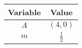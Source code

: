 \begin{tabular}{|c|c|}
\hline
\textbf{Variable} & \textbf{Value} \\
\hline
$A$ & $(4,0)$ \\
\hline
$m$ & $\frac{1}{2}$ \\
\hline
\end{tabular}